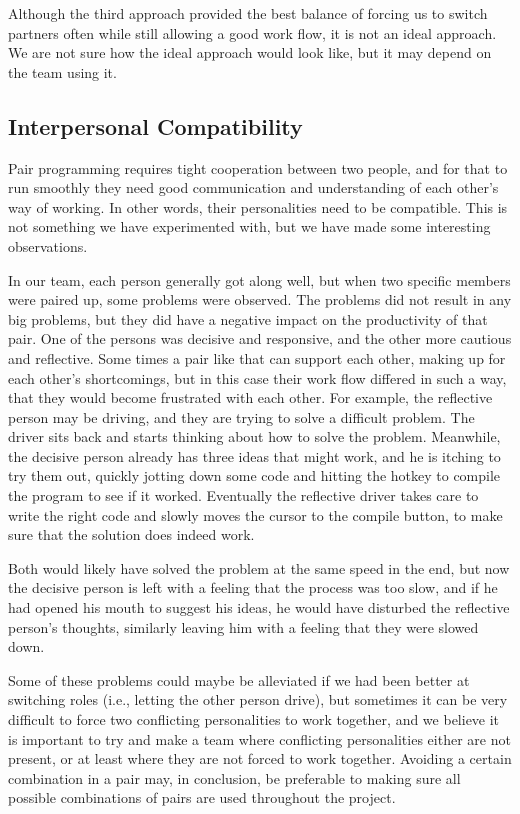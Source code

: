 Although the third approach provided the best balance of forcing us to switch partners often while still allowing a good work flow, it is not an ideal approach.
We are not sure how the ideal approach would look like, but it may depend on the team using it.

\subsection{Interpersonal Compatibility}
Pair programming requires tight cooperation between two people, and for that to run smoothly they need good communication and understanding of each other's way of working.
In other words, their personalities need to be compatible.
This is not something we have experimented with, but we have made some interesting observations. 

In our team, each person generally got along well, but when two specific members were paired up, some problems were observed.
The problems did not result in any big problems, but they did have a negative impact on the productivity of that pair.
One of the persons was decisive and responsive, and the other more cautious and reflective.
Some times a pair like that can support each other, making up for each other's shortcomings, but in this case their work flow differed in such a way, that they would become frustrated with each other.
For example, the reflective person may be driving, and they are trying to solve a difficult problem. The driver sits back and starts thinking about how to solve the problem.
Meanwhile, the decisive person already has three ideas that might work, and he is itching to try them out, quickly jotting down some code and hitting the hotkey to compile the program to see if it worked.
Eventually the reflective driver takes care to write the right code and slowly moves the cursor to the compile button, to make sure that the solution does indeed work.

Both would likely have solved the problem at the same speed in the end, but now the decisive person is left with a feeling that the process was too slow, and if he had opened his mouth to suggest his ideas, he would have disturbed the reflective person's thoughts, similarly leaving him with a feeling that they were slowed down.

Some of these problems could maybe be alleviated if we had been better at switching roles (i.e., letting the other person drive), but sometimes it can be very difficult to force two conflicting personalities to work together, and we believe it is important to try and make a team where conflicting personalities either are not present, or at least where they are not forced to work together.
Avoiding a certain combination in a pair may, in conclusion, be preferable to making sure all possible combinations of pairs are used throughout the project.


